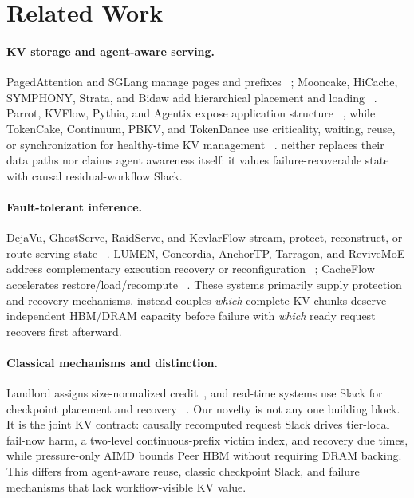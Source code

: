 \section{Related Work}
\label{sec:related-work}

\paragraph{KV storage and agent-aware serving.}
PagedAttention and SGLang manage pages and prefixes
~\cite{kwon2023vllm,zheng2024sglang}; Mooncake, HiCache, SYMPHONY, Strata, and
Bidaw add hierarchical placement and loading
~\cite{qin2025mooncake,xie2025hicache,agarwal2026symphony,xie2026strata,
hu2026bidaw}.  Parrot, KVFlow, Pythia, and Agentix expose application structure
~\cite{lin2024parrot,pan2025kvflow,yu2026pythia,luo2026agentix}, while
TokenCake, Continuum, PBKV, and TokenDance use criticality, waiting, reuse, or
synchronization for healthy-time KV management
~\cite{bian2026tokencake,li2026continuum,zheng2026pbkv,bian2026tokendance}.
\system{} neither replaces their data paths nor claims agent awareness itself:
it values failure-recoverable state with causal residual-workflow Slack.

\paragraph{Fault-tolerant inference.}
DejaVu, GhostServe, RaidServe, and KevlarFlow stream, protect, reconstruct,
or route serving state
~\cite{strati2024dejavu,jayakody2026ghostserve,xu2026raidserve,
qian2026kevlarflow}.  LUMEN, Concordia, AnchorTP, Tarragon, and ReviveMoE
address complementary execution recovery or reconfiguration
~\cite{cao2026lumen,gan2026concordia,xu2026anchortp,zhang2026tarragon,
li2026revivemoe}; CacheFlow accelerates restore/load/recompute
~\cite{nian2026cacheflow}.  These systems primarily supply protection and
recovery mechanisms.  \system{} instead couples \emph{which} complete KV
chunks deserve independent HBM/DRAM capacity before failure with \emph{which}
ready request recovers first afterward.

\paragraph{Classical mechanisms and distinction.}
Landlord assigns size-normalized credit~\cite{young2002online}, and real-time
systems use Slack for checkpoint placement and recovery
~\cite{melhem2004interplay,acharya2008dynamic}.  Our novelty is not any one
building block.  It is the joint KV contract: causally recomputed request Slack
drives tier-local fail-now harm, a two-level continuous-prefix victim index,
and recovery due times, while pressure-only AIMD bounds Peer HBM without
requiring DRAM backing.  This differs from agent-aware reuse, classic
checkpoint Slack, and failure mechanisms that lack workflow-visible KV value.

